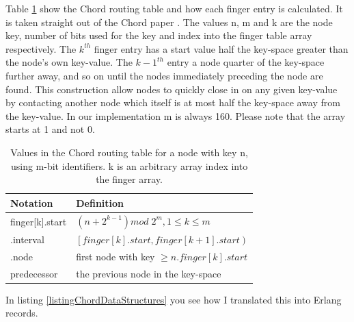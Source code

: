 Table \ref{tableChordRoutingTable} show the Chord routing table and how each finger entry is calculated. It is taken straight out of the Chord paper \cite{chord}. The values n, m and k are the node key, number of bits used for the key and index into the finger table array respectively. 
The $ k^{th} $ finger entry has a start value half the key-space greater than the node's own key-value. The $ k-1^{th} $ entry a node quarter of the key-space further away, and so on until the nodes immediately preceding the node are found.
This construction allow nodes to quickly close in on any given key-value by contacting another node which itself is at most half the key-space away from the key-value.
In our implementation m is always 160. Please note that the array starts at 1 and not 0.

\begin{table}[h]
\caption{Values in the Chord routing table for a node with key n, using m-bit identifiers. k is an arbitrary array index into the finger array.}
\begin{center}
\begin{tabular}{ | l | l | }
  \hline                       
  Notation & Definition \\
  \hline  
  \hline  
  finger[k].start & $\left( n + 2^{k - 1} \right) mod \; 2^{m} , 1 \leq k \leq m $ \\
  \hline  
  \;.interval & $ \left[ finger[k].start, finger[k+1].start \right) $ \\
  \hline  
  \;.node & first node with key $ \geq n.finger[k].start $ \\
  \hline  
  predecessor & the previous node in the key-space \\
  \hline  
\end{tabular}
\end{center}
\label{tableChordRoutingTable}
\end{table}

In listing \ref{listingChordDataStructures} you see how I translated this into Erlang records.



